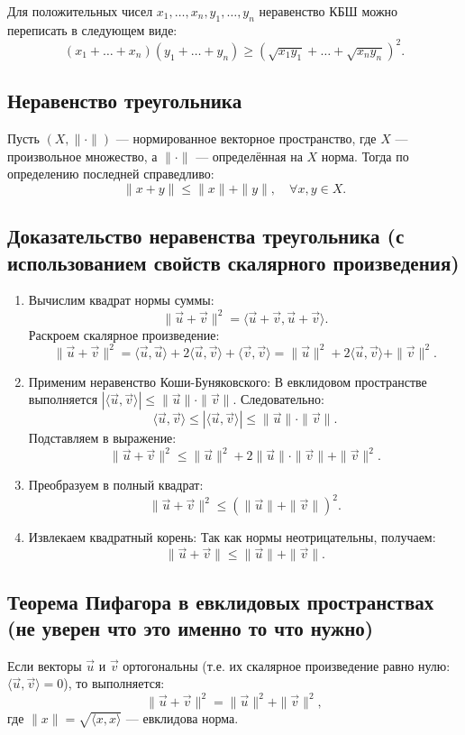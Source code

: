 \documentclass[12pt]{article}
\begin{document}
Для положительных чисел $x_1, \dots, x_n, y_1, \dots, y_n$ неравенство КБШ можно переписать в следующем виде:
$$
(x_1 + \dots + x_n)(y_1 + \dots + y_n) \geq \left( \sqrt{x_1 y_1} + \dots + \sqrt{x_n y_n} \right)^2.
$$

\subsection*{Неравенство треугольника}
Пусть $(X, \|\cdot\|)$ — нормированное векторное пространство, где $X$ — произвольное множество, а $\|\cdot\|$ — определённая на $X$ норма. Тогда по определению последней справедливо:
$$
\|x + y\| \leq \|x\| + \|y\|, \quad \forall x, y \in X.
$$
\subsection*{Доказательство неравенства треугольника (с использованием свойств скалярного произведения)}
\begin{enumerate}
    \item Вычислим квадрат нормы суммы:
    $$
    \|\vec{u} + \vec{v}\|^2 = \langle \vec{u} + \vec{v}, \vec{u} + \vec{v} \rangle.
    $$
    Раскроем скалярное произведение:
    $$
    \|\vec{u} + \vec{v}\|^2 = \langle \vec{u}, \vec{u} \rangle + 2\langle \vec{u}, \vec{v} \rangle + \langle \vec{v}, \vec{v} \rangle = \|\vec{u}\|^2 + 2\langle \vec{u}, \vec{v} \rangle + \|\vec{v}\|^2.
    $$
    
    \item Применим неравенство Коши-Буняковского:  
    В евклидовом пространстве выполняется $|\langle \vec{u}, \vec{v} \rangle| \leq \|\vec{u}\| \cdot \|\vec{v}\|$. Следовательно:
    $$
    \langle \vec{u}, \vec{v} \rangle \leq |\langle \vec{u}, \vec{v} \rangle| \leq \|\vec{u}\| \cdot \|\vec{v}\|.
    $$
    Подставляем в выражение:
    $$
    \|\vec{u} + \vec{v}\|^2 \leq \|\vec{u}\|^2 + 2\|\vec{u}\| \cdot \|\vec{v}\| + \|\vec{v}\|^2.
    $$
    
    \item Преобразуем в полный квадрат:
    $$
    \|\vec{u} + \vec{v}\|^2 \leq (\|\vec{u}\| + \|\vec{v}\|)^2.
    $$
    
    \item Извлекаем квадратный корень:  
    Так как нормы неотрицательны, получаем:
    $$
    \|\vec{u} + \vec{v}\| \leq \|\vec{u}\| + \|\vec{v}\|.
    $$
\end{enumerate}


\subsection*{Теорема Пифагора в евклидовых пространствах (не уверен что это именно то что нужно)}
Если векторы $\vec{u}$ и $\vec{v}$ ортогональны (т.е. их скалярное произведение равно нулю: $\langle \vec{u}, \vec{v} \rangle = 0$), то выполняется:
$$
\|\vec{u} + \vec{v}\|^2 = \|\vec{u}\|^2 + \|\vec{v}\|^2,
$$
где $\|x\| = \sqrt{\langle x, x \rangle}$ — евклидова норма.
\end{document}
